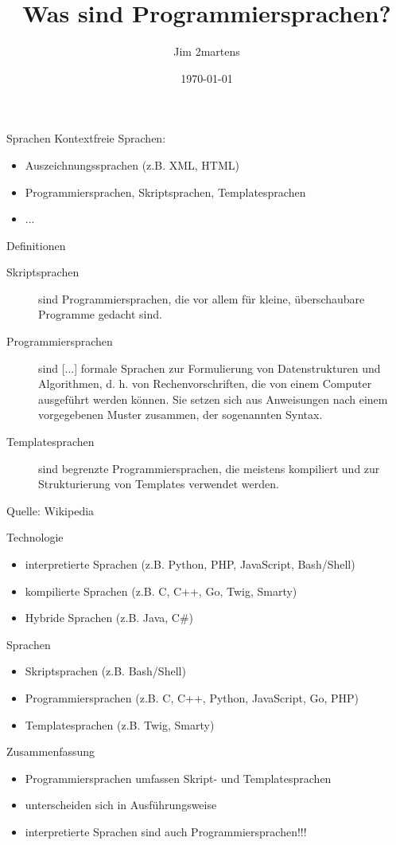 \documentclass{beamer}
\begin{document}
\author{Jim 2martens}
\title{Was sind Programmiersprachen?}
\date{\today}

\begin{frame}
    \titlepage
\end{frame}

\begin{frame}{Sprachen}
    Kontextfreie Sprachen:
    \begin{itemize}
        \item<2-> Auszeichnungssprachen (z.B. XML, HTML)
        \item<3-> Programmiersprachen, Skriptsprachen, Templatesprachen
        \item<4-> ...
    \end{itemize}
\end{frame}

\begin{frame}{Definitionen}
    \begin{description}
        \item[Skriptsprachen] sind Programmiersprachen, die vor allem für kleine, überschaubare Programme gedacht sind.
        \item[Programmiersprachen] sind [...] formale Sprachen zur Formulierung von Datenstrukturen und Algorithmen, d. h. von Rechenvorschriften, die von einem Computer ausgeführt werden können. Sie setzen sich aus Anweisungen nach einem vorgegebenen Muster zusammen, der sogenannten Syntax.
        \item[Templatesprachen] sind begrenzte Programmiersprachen, die meistens kompiliert und zur Strukturierung von Templates verwendet werden.
    \end{description}

    Quelle: Wikipedia
\end{frame}

\begin{frame}{Technologie}
    \begin{itemize}
        \item interpretierte Sprachen (z.B. Python, PHP, JavaScript, Bash/Shell)
        \item kompilierte Sprachen (z.B. C, C++, Go, Twig, Smarty)
        \item Hybride Sprachen (z.B. Java, C\#)
    \end{itemize}
\end{frame}

\begin{frame}{Sprachen}
    \begin{itemize}
        \item Skriptsprachen (z.B. Bash/Shell)
        \item Programmiersprachen (z.B. C, C++, Python, JavaScript, Go, PHP)
        \item Templatesprachen (z.B. Twig, Smarty)
    \end{itemize}
\end{frame}

\begin{frame}{Zusammenfassung}
    \begin{itemize}
        \item Programmiersprachen umfassen Skript- und Templatesprachen
        \item unterscheiden sich in Ausführungsweise
        \item interpretierte Sprachen sind auch Programmiersprachen!!!
    \end{itemize}
\end{frame}
\end{document}
